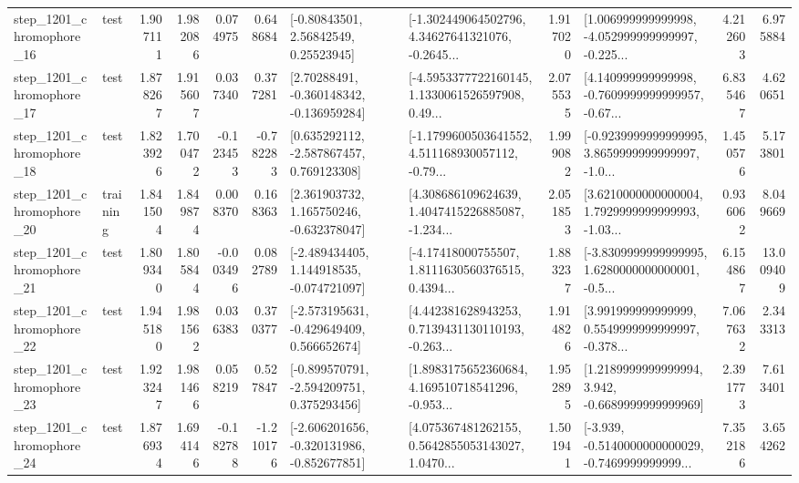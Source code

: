 \begin{tabular}{llrrrrllrlrr}
 step\_1201\_chromophore\_16 &      test &      1.907111 &    1.982086 &      0.074975 &  0.648684 &       [-0.80843501, 2.56842549, 0.25523945] &  [-1.302449064502796, 4.34627641321076, -0.2645... &       1.917020 &  [1.006999999999998, -4.052999999999997, -0.225... &            4.212603 &          6.975884 \\
 step\_1201\_chromophore\_17 &      test &      1.878267 &    1.915607 &      0.037340 &  0.377281 &    [2.70288491, -0.360148342, -0.136959284] &  [-4.5953377722160145, 1.1330061526597908, 0.49... &       2.075535 &  [4.140999999999998, -0.7609999999999957, -0.67... &            6.835467 &          4.620651 \\
 step\_1201\_chromophore\_18 &      test &      1.823926 &    1.700472 &     -0.123453 & -0.782283 &    [0.635292112, -2.587867457, 0.769123308] &  [-1.1799600503641552, 4.511168930057112, -0.79... &       1.999082 &  [-0.9239999999999995, 3.8659999999999997, -1.0... &            1.450576 &          5.173801 \\
 step\_1201\_chromophore\_20 &  training &      1.841504 &    1.849874 &      0.008370 &  0.168363 &    [2.361903732, 1.165750246, -0.632378047] &  [4.308686109624639, 1.4047415226885087, -1.234... &       2.051853 &  [3.6210000000000004, 1.7929999999999993, -1.03... &            0.936062 &          8.049669 \\
 step\_1201\_chromophore\_21 &      test &      1.809340 &    1.805844 &     -0.003496 &  0.082789 &   [-2.489434405, 1.144918535, -0.074721097] &  [-4.17418000755507, 1.8111630560376515, 0.4394... &       1.883237 &  [-3.8309999999999995, 1.6280000000000001, -0.5... &            6.154867 &         13.009409 \\
 step\_1201\_chromophore\_22 &      test &      1.945180 &    1.981562 &      0.036383 &  0.370377 &   [-2.573195631, -0.429649409, 0.566652674] &  [4.442381628943253, 0.7139431130110193, -0.263... &       1.914826 &  [3.991999999999999, 0.5549999999999997, -0.378... &            7.067632 &          2.343313 \\
 step\_1201\_chromophore\_23 &      test &      1.923247 &    1.981466 &      0.058219 &  0.527847 &   [-0.899570791, -2.594209751, 0.375293456] &  [1.8983175652360684, 4.169510718541296, -0.953... &       1.952895 &   [1.2189999999999994, 3.942, -0.6689999999999969] &            2.391773 &          7.613401 \\
 step\_1201\_chromophore\_24 &      test &      1.876934 &    1.694146 &     -0.182788 & -1.210176 &  [-2.606201656, -0.320131986, -0.852677851] &  [4.075367481262155, 0.5642855053143027, 1.0470... &       1.501941 &  [-3.939, -0.5140000000000029, -0.7469999999999... &            7.352186 &          3.654262 \\

\end{tabular}
